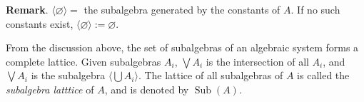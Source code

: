 \documentclass[12pt]{article}
\begin{document}
\textbf{Remark}.  $\langle \varnothing\rangle =$ the subalgebra generated by the constants of $A$.  If no such constants exist, $\langle \varnothing \rangle :=\varnothing$.

From the discussion above, the set of subalgebras of an algebraic system forms a complete lattice.  Given subalgebras $A_i$, $\bigvee A_i$ is the intersection of all $A_i$, and $\bigvee A_i$ is the subalgebra $\langle \bigcup A_i\rangle$.  The lattice of all subalgebras of $A$ is called the \emph{subalgebra latttice} of $A$, and is denoted by $\operatorname{Sub}(A)$.
\end{document}
